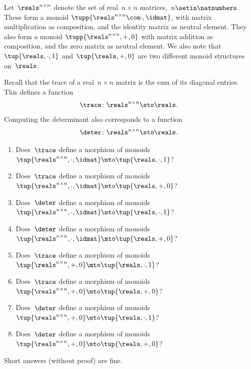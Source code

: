 \begin{gradedexercise}
    \label{ex:TraceAndDeterminant}
    Let~$\reals^{n \times n}$ denote the set of real~$n \times n$ matrices,~$n \setin \natnumbers$.
    These form a monoid $\tupp{\reals^{n \times n}\com \cdot, \idmat}$, with matrix multiplication as composition, and the identity matrix as neutral element.
    They also form a monoid $\tupp{\reals^{n \times n}, {{+}}, 0}$ with matrix addition as composition, and the zero matrix as neutral element.
    We also note that~$\tup{\reals, {{\cdot}}, 1}$ and~$\tup{\reals, {{+}}, 0}$ are two different monoid structures on~$\reals$.

    Recall that the trace of a real~$n \times n$ matrix is the sum of its diagonal entries.
    This defines a function
    \begin{equation}
        \trace \colon \reals^{n \times n} \sto \reals.
    \end{equation}
    Computing the determinant also corresponds to a function
    \begin{equation}
        \deter \colon \reals^{n \times n} \sto \reals.
    \end{equation}

    \begin{enumerate}
        \item Does~$\trace$ define a morphism of monoids~$\tup{\reals^{n \times n}, {{\cdot}},  \idmat} \mto \tup{\reals, {{\cdot}},  1}$?
        \item Does~$\trace$ define a morphism of monoids~$\tup{\reals^{n \times n}, {{\cdot}},  \idmat} \mto \tup{\reals, {{+}},  0}$?
        \item Does~$\deter$ define a morphism of monoids~$\tup{\reals^{n \times n}, {{\cdot}},  \idmat} \mto \tup{\reals, {{\cdot}},  1}$?
        \item Does~$\deter$ define a morphism of monoids~$\tup{\reals^{n \times n}, {{\cdot}},  \idmat} \mto \tup{\reals, {{+}},  0}$?
        \item Does~$\trace$ define a morphism of monoids~$\tup{\reals^{n \times n}, {{+}},  0} \mto \tup{\reals, {{\cdot}},  1}$?
        \item Does~$\trace$ define a morphism of monoids~$\tup{\reals^{n \times n}, {{+}},  0} \mto \tup{\reals, {{+}},  0}$?
        \item Does~$\deter$ define a morphism of monoids~$\tup{\reals^{n \times n}, {{+}},  0} \mto \tup{\reals, {{\cdot}},  1}$?
        \item Does~$\deter$ define a morphism of monoids~$\tup{\reals^{n \times n}, {{+}},  0} \mto \tup{\reals, {{+}},  0}$?
    \end{enumerate}
    Short answers (without proof) are fine.
\end{gradedexercise}

